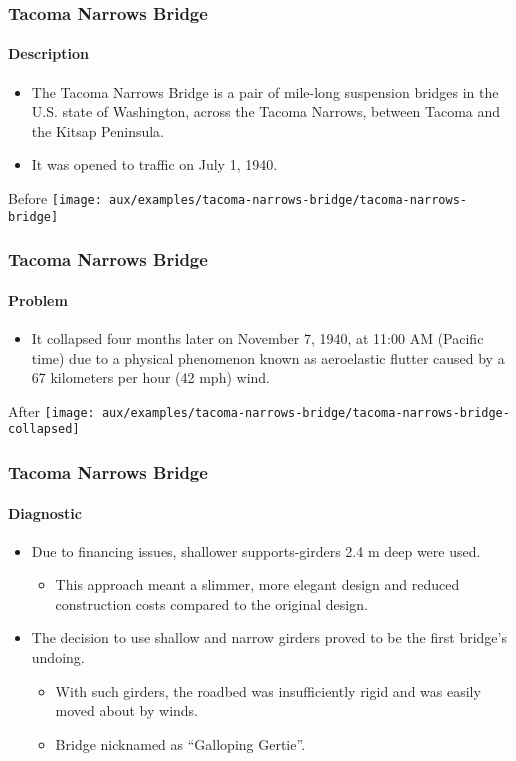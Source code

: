 \begin{frame}[hasprev=false, hasnext=true]
\label{example:tacoma-narrows-bridge}
\frametitle{Tacoma Narrows Bridge}
\framesubtitle{Description}

\begin{itemize}
	\item The Tacoma Narrows Bridge is a pair of mile-long suspension bridges
	in the U.S. state of Washington, across the Tacoma Narrows, between Tacoma
	and the Kitsap Peninsula.

	\item It was opened to traffic on July 1, 1940.
\end{itemize}

\begin{block:ie}{Before}
	\centering
	\texttt{[image: aux/examples/tacoma-narrows-bridge/tacoma-narrows-bridge]}
\end{block:ie}
\end{frame}



\begin{frame}[hasprev=true, hasnext=true]
\frametitle{Tacoma Narrows Bridge}
\framesubtitle{Problem}

\begin{itemize}
	\item It collapsed four months later on November 7, 1940, at 11:00 AM
	(Pacific time) due to a physical phenomenon known as aeroelastic flutter
	caused by a 67 kilometers per hour (42 mph) wind.
\end{itemize}

\begin{block:ie}{After}
	\centering
	\texttt{[image: aux/examples/tacoma-narrows-bridge/tacoma-narrows-bridge-collapsed]}
\end{block:ie}
\end{frame}



\begin{frame}
\frametitle{Tacoma Narrows Bridge}
\framesubtitle{Diagnostic}

\begin{itemize}
	\item Due to financing issues, shallower supports-girders 2.4 m deep were
	used.
	\begin{itemize}
		\item This approach meant a slimmer, more elegant design and reduced
		construction costs compared to the original design.
	\end{itemize}

	\item The decision to use shallow and narrow girders proved to be the first
	bridge's undoing.
	\begin{itemize}
		\item With such girders, the roadbed was insufficiently rigid and was
		easily moved about by winds.

		\item Bridge nicknamed as ``Galloping Gertie''.
	\end{itemize}
\end{itemize}
\end{frame}


